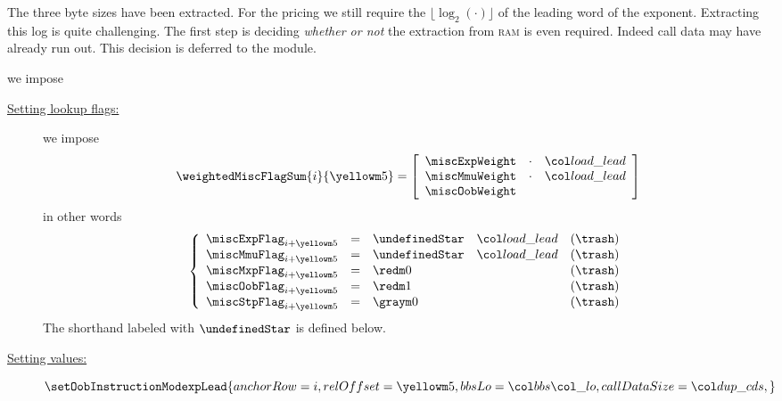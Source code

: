 	The three byte sizes have been extracted.
	For the pricing we still require the $\lfloor\log_{2}(\cdot)\rfloor$ of the leading word of the exponent.
	Extracting this log is quite challenging.
	The first step is deciding \emph{whether or not} the extraction from \textsc{ram} is even required.
	Indeed call data may have already run out.
	This decision is deferred to the \oobMod{} module.
	\begin{description}
		\def\rowNum{\yellowm{5}} \item[\underline{\underline{Miscellaneous row $n^°(i + \prcModexpLeadRowOffset)$:}}] we impose 
			\begin{description}
				\item[\underline{Setting lookup flags:}]
					we impose
					\[
						\weightedMiscFlagSum
						{i}{\prcModexpLeadRowOffset}
						=
						\left[ \begin{array}{crcl}
							\miscExpWeight  & \cdot & \locLoadLeadingWord \\
							\miscMmuWeight  & \cdot & \locLoadLeadingWord \\
							\miscOobWeight \\
						\end{array} \right]
					\]
					in other words
					\[
						\left\{ \begin{array}{lclr}
							\miscExpFlag _{i + \prcModexpLeadRowOffset} & = & \undefinedStar \quad \locLoadLeadingWord & (\trash) \\
							\miscMmuFlag _{i + \prcModexpLeadRowOffset} & = & \undefinedStar \quad \locLoadLeadingWord & (\trash) \\
							\miscMxpFlag _{i + \prcModexpLeadRowOffset} & = & \rZero                                   & (\trash) \\
							\miscOobFlag _{i + \prcModexpLeadRowOffset} & = & \one                                     & (\trash) \\
							\miscStpFlag _{i + \prcModexpLeadRowOffset} & = & \gZero                                   & (\trash) \\
						\end{array} \right.
					\]
					\saNote{} The shorthand \locLoadLeadingWord{} labeled with $\undefinedStar$ is defined below.
				\item[\underline{Setting \oobMod{} values:}] 
					\[
						\setOobInstructionModexpLead {
							anchorRow    = i                       ,
							relOffset    = \prcModexpLeadRowOffset ,
							bbsLo        = \locBbsLo               ,
							callDataSize = \locPrcCds              ,
}\]
\end{description}
\end{description}
